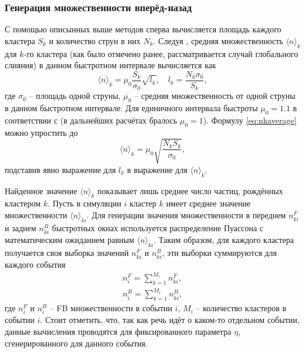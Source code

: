 \subsubsection{Генерация множественности вперёд-назад}
С помощью описынных выше методов сперва вычисляется площадь каждого кластера $S_k$ и количество струн в них $N_k$. Следуя \cite{MulReduction}, средняя множественность $\langle n \rangle_k$ для $k$-го кластера (как было отмечено ранее, рассматривается случай глобального слияния) в данном быстротном интервале вычисляется как 
\begin{equation} \label{eq:nkaverage}
	\langle n \rangle_k = \mu_0 \frac{S_k}{\sigma_0}\sqrt{l_k}, \quad l_k = \frac{N_k \sigma_0}{S_k},
\end{equation}
где $\sigma_0$ -- площадь одной струны, $\mu_0$ -- средняя множественность от одной струны в данном быстротном интервале. Для единичного интервала быстроты $\mu_0 = 1.1$ в соответствии с \cite{Mu0} (в дальнейших расчётах бралось $\mu_0 = 1$). Формулу \ref{eq:nkaverage} можно упростить до 
\begin{equation} \label{eq:nksimple}
	\langle n \rangle_k = \mu_0 \sqrt{\frac{N_k S_k}{\sigma_0}},
\end{equation}
подставив явно выражение для $l_k$ в выражение для $\langle n \rangle_k$.

Найденное значение $\langle n \rangle_k$ показывает лишь среднее число частиц, рождённых кластером $k$. Пусть в симуляции $i$ кластер $k$ имеет среднее значение множественности $\langle n \rangle_{ki}$. Для генерации значения множественности в переднем $n^F_{ki}$ и заднем $n^B_{ki}$ быстротных окнах используется распределение Пуассона с математическим ожиданием равным $\langle n \rangle_{ki}$. Таким образом, для каждого кластера получается своя выборка значений $n^F_{ki}$ и $n^B_{ki}$, эти выборки суммируются для каждого события 
\begin{equation} \label{eq:nfnb}
\begin{split}
	n^F_i = \sum_{k = 1}^{M_i} n^F_{ki}, \\
	n^B_i = \sum_{k = 1}^{M_i} n^B_{ki},
\end{split}
\end{equation}
где $n^F_i$ и $n^B_i$ -- FB множественности в событии $i$, $M_i$ -- количество кластеров в событии $i$. Стоит отметить, что, так как речь идёт о каком-то отдельном событии, данные вычисления проводятся для фиксированного параметра $\eta$, сгенерированного для данного события. 
